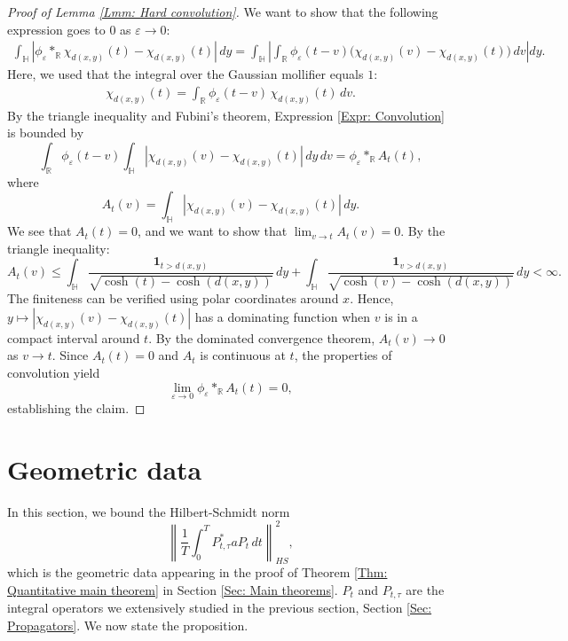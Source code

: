 \documentclass[11pt,twoside,reqno]{amsart} \usepackage{a4wide} \usepackage[T1]{fontenc} \usepackage[utf8]{inputenc} \usepackage{soul}  \usepackage{amsmath} \usepackage{amsfonts} \usepackage{amssymb} \usepackage{mathtools} \usepackage{amsthm} \usepackage{xcolor} \usepackage{graphicx} \usepackage{hyperref} \usepackage{standalone} \usepackage{esint} \usepackage{comment} \usepackage[left=2.3cm,top=3cm,right=2.3cm]{geometry} \usepackage{bm} \usepackage{svg} \usepackage{float} \numberwithin{equation}{section} \theoremstyle{plain} \newtheorem{thm}{Theorem}[section] \newtheorem{theorem}[thm]{Theorem} \newtheorem*{theorem*}{Theorem}\newtheorem{conj}[thm]{Conjecture} \newtheorem{lemma}[thm]{Lemma} \newtheorem{prop}[thm]{Proposition} \newtheorem{proposition}[thm]{Proposition} \newtheorem{cor}[thm]{Corollary} \newtheorem{question}[thm]{Question} \newtheorem{corollary}[thm]{Corollary} \newtheorem{assumption}[thm]{Assumption} \theoremstyle{definition} \newtheorem{defn}[thm]{Definition} \newtheorem{choice}[thm]{Choice} \newtheorem{definition}[thm]{Definition} \newtheorem{ex}[thm]{Example} \newtheorem{notation}[thm]{Notation} \newtheorem*{ack}{Acknowledgements} \theoremstyle{remark} \newtheorem{remark}[thm]{Remark} \newtheorem{bigremark}[thm]{Remark} \usepackage{xcolor} \newcommand{\red}[1]{ {\color{Red}#1} } \newcommand{\blue}[1]{ {\color{Blue}#1} } \author{Kai Hippi} \address{Aalto University, Espoo, Finland} \email{kai.hippi@aalto.fi}
\begin{document}
\begin{proof}[Proof of Lemma \ref{Lmm: Hard convolution}]
We want to show that the following expression goes to $0$ as $\varepsilon \to 0$:
\begin{align}
	\label{Expr: Convolution}
	\int_\mathbb{H} \left| \phi_\varepsilon \ast_\mathbb{R} \chi_{d(x,y)}(t) - \chi_{d(x,y)}(t) \right| \, dy
	= \int_\mathbb{H} \left| \int_\mathbb{R} \phi_\varepsilon(t-v) \big( \chi_{d(x,y)}(v) - \chi_{d(x,y)}(t) \big) \, dv \right| dy.
\end{align}
Here, we used that the integral over the Gaussian mollifier equals $1$:
\begin{align*}
	\chi_{d(x,y)}(t) = \int_\mathbb{R} \phi_{\varepsilon}(t - v) \, \chi_{d(x,y)}(t) \, dv.
\end{align*}
By the triangle inequality and Fubini's theorem, Expression \eqref{Expr: Convolution} is bounded by
\[
\int_\mathbb{R} \phi_\varepsilon(t-v) \int_\mathbb{H} \left| \chi_{d(x,y)}(v) - \chi_{d(x,y)}(t) \right| \, dy \, dv = \phi_\varepsilon \ast_\mathbb{R} A_{t}(t),
\]
where 
$$A_{t}(v) = \int_\mathbb{H} |\chi_{d(x,y)}(v) - \chi_{d(x,y)}(t)| \, dy.$$
We see that $A_{t}(t) = 0$, and we want to show that $\lim_{v \to t} A_{t}(v) = 0$. By the triangle inequality:
\[
A_t(v) \le \int_\mathbb{H} \frac{\mathbf{1}_{t > d(x,y)}}{\sqrt{\cosh(t) - \cosh(d(x,y))}} \, dy + \int_\mathbb{H} \frac{\mathbf{1}_{v > d(x,y)}}{\sqrt{\cosh(v) - \cosh(d(x,y))}} \, dy < \infty.
\]
The finiteness can be verified using polar coordinates around $x$. Hence, $y \mapsto |\chi_{d(x,y)}(v) - \chi_{d(x,y)}(t)|$ has a dominating function when $v$ is in a compact interval around $t$. By the dominated convergence theorem, $A_{t}(v) \to 0$ as $v \to t$. Since $A_{t}(t) = 0$ and $A_{t}$ is continuous at $t$, the properties of convolution yield
$$
\lim_{\varepsilon \to 0} \phi_\varepsilon \ast_\mathbb{R} A_{t}(t) = 0,
$$
establishing the claim.
\end{proof}


\section{Geometric data}
\label{Sec: Geometric data}

\noindent
In this section, we bound the Hilbert-Schmidt norm 
\[
\left\| \frac{1}{T} \int_0^T P_{t,\tau}^{*} a P_t \, dt \right\|_{HS}^{2} ,
\]
which is the geometric data appearing in the proof of Theorem \ref{Thm: Quantitative main theorem} in Section \ref{Sec: Main theorems}. $ P_{t} $ and $ P_{t,\tau} $ are the integral operators we extensively studied in the previous section, Section \ref{Sec: Propagators}. We now state the proposition.
\end{document}
